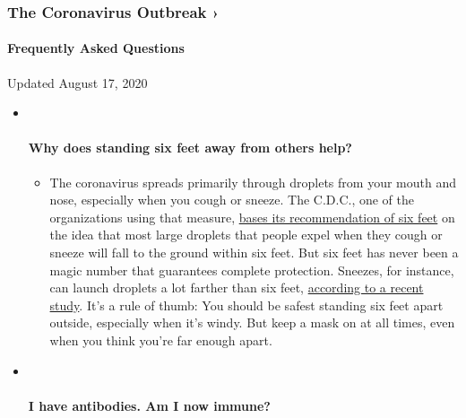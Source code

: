 \hypertarget{the-coronavirus-outbreak-}{%
\subsubsection{The Coronavirus Outbreak
›}\label{the-coronavirus-outbreak-}}

\hypertarget{frequently-asked-questions}{%
\paragraph{Frequently Asked
Questions}\label{frequently-asked-questions}}

Updated August 17, 2020

\begin{itemize}
\item ~
  \hypertarget{why-does-standing-six-feet-away-from-others-help}{%
  \paragraph{Why does standing six feet away from others
  help?}\label{why-does-standing-six-feet-away-from-others-help}}

  \begin{itemize}
  \tightlist
  \item
    The coronavirus spreads primarily through droplets from your mouth
    and nose, especially when you cough or sneeze. The C.D.C., one of
    the organizations using that measure,
    \href{https://www.nytimes3xbfgragh.onion/2020/04/14/health/coronavirus-six-feet.html?action=click\&pgtype=Article\&state=default\&region=MAIN_CONTENT_3\&context=storylines_faq}{bases
    its recommendation of six feet} on the idea that most large droplets
    that people expel when they cough or sneeze will fall to the ground
    within six feet. But six feet has never been a magic number that
    guarantees complete protection. Sneezes, for instance, can launch
    droplets a lot farther than six feet,
    \href{https://jamanetwork.com/journals/jama/fullarticle/2763852}{according
    to a recent study}. It's a rule of thumb: You should be safest
    standing six feet apart outside, especially when it's windy. But
    keep a mask on at all times, even when you think you're far enough
    apart.
  \end{itemize}
\item ~
  \hypertarget{i-have-antibodies-am-i-now-immune}{%
  \paragraph{I have antibodies. Am I now
  immune?}\label{i-have-antibodies-am-i-now-immune}}


\end{itemize}

